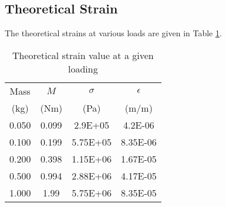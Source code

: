 \section{}



\subsection{Theoretical Strain}
The theoretical strains at various loads are given in Table \ref{tab:Q2TheoreticalStrain}.
\begin{table}[h]
    \centering
    \caption{Theoretical strain value at a given loading}
    \label{tab:Q2TheoreticalStrain}
    \begin{tabular}{cccc}
        \toprule
        Mass & $M$ & $\sigma$ & $\epsilon$ \\
        (kg) & (Nm) & (Pa) & (m/m) \\
        \midrule
        0.050 & 0.099 & 2.9E+05 & 4.2E-06 \\
        0.100 & 0.199 & 5.75E+05 & 8.35E-06 \\
        0.200 & 0.398 & 1.15E+06 & 1.67E-05 \\
        0.500 & 0.994 & 2.88E+06 & 4.17E-05 \\
        1.000 & 1.99 & 5.75E+06 & 8.35E-05 \\
        \bottomrule
    \end{tabular}
\end{table}

